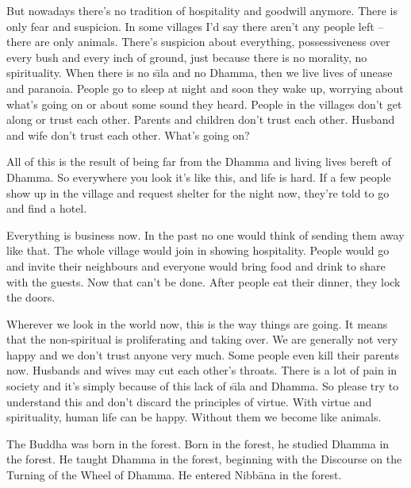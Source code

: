 But nowadays there's no tradition of hospitality and goodwill anymore. There is only fear and suspicion. In some villages I'd say there aren't any people left -- there are only animals. There's suspicion about everything, possessiveness over every bush and every inch of ground, just because there is no morality, no spirituality. When there is no s\={\i}la and no Dhamma, then we live lives of unease and paranoia. People go to sleep at night and soon they wake up, worrying about what's going on or about some sound they heard. People in the villages don't get along or trust each other. Parents and children don't trust each other. Husband and wife don't trust each other. What's going on? 

All of this is the result of being far from the Dhamma and living lives bereft of Dhamma. So everywhere you look it's like this, and life is hard. If a few people show up in the village and request shelter for the night now, they're told to go and find a hotel. 

Everything is business now. In the past no one would think of sending them away like that. The whole village would join in showing hospitality. People would go and invite their neighbours and everyone would bring food and drink to share with the guests. Now that can't be done. After people eat their dinner, they lock the doors. 

Wherever we look in the world now, this is the way things are going. It means that the non-spiritual is proliferating and taking over. We are generally not very happy and we don't trust anyone very much. Some people even kill their parents now. Husbands and wives may cut each other's throats. There is a lot of pain in society and it's simply because of this lack of s\={\i}la and Dhamma. So please try to understand this and don't discard the principles of virtue. With virtue and spirituality, human life can be happy. Without them we become like animals. 

The Buddha was born in the forest. Born in the forest, he studied Dhamma in the forest. He taught Dhamma in the forest, beginning with the Discourse on the Turning of the Wheel of Dhamma. He entered Nibb\=ana in the forest. 

